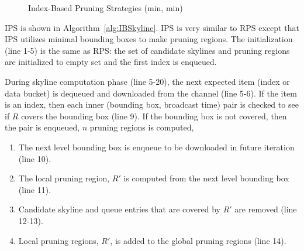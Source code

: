 \begin{figure}[h]
  \centering
  \caption{Index-Based Pruning Strategies (min, min)}
  \label{fig:ibp}
\end{figure}

IPS is shown in Algorithm~\ref{alg:IBSkyline}. IPS is very similar to RPS except that IPS utilizes minimal bounding boxes to make pruning regions. The initialization (line 1-5) is the same as RPS: the set of candidate skylines and pruning regions are initialized to empty set and the first index is enqueued.

During skyline computation phase (line 5-20), the next expected item (index or data bucket) is dequeued and downloaded from the channel (line 5-6). If the item is an index, then each inner (bounding box, broadcast time) pair is checked to see if $R$ covers the bounding box (line 9). If the bounding box is not covered, then the pair is enqueued, $n$ pruning regions is computed,

\begin{enumerate}
\item The next level bounding box is enqueue to be downloaded in future iteration (line 10).
\item The local pruning region, $R'$ is computed from the next level bounding box (line 11).
\item Candidate skyline and queue entries that are covered by $R'$ are removed (line 12-13).
\item Local pruning regions, $R'$, is added to the global pruning regions (line 14).
\end{enumerate}

